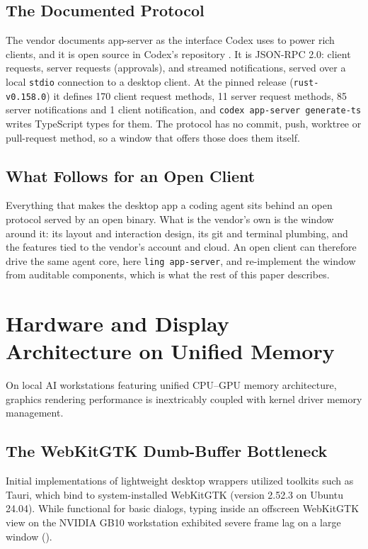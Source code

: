 \documentclass[11pt]{article}
\newcommand{\code}[1]{\texttt{#1}}
\begin{document}
\subsection{The Documented Protocol}

The vendor documents app-server as the interface Codex uses to power rich clients, and it is open source in Codex's
repository \cite{openai2026codex}. It is JSON-RPC 2.0: client requests, server requests (approvals), and streamed
notifications, served over a local \code{stdio} connection to a desktop client. At the pinned release
(\code{rust-v0.158.0}) it defines 170 client request methods, 11 server request methods, 85 server notifications and 1
client notification, and \code{codex app-server generate-ts} writes TypeScript types for them. The protocol has no
commit, push, worktree or pull-request method, so a window that offers those does them itself.

\subsection{What Follows for an Open Client}

Everything that makes the desktop app a coding agent sits behind an open protocol served by an open binary. What is
the vendor's own is the window around it: its layout and interaction design, its git and terminal plumbing, and the
features tied to the vendor's account and cloud. An open client can therefore drive the same agent core, here
\code{ling app-server}, and re-implement the window from auditable components, which is what the rest of this paper
describes.

\section{Hardware and Display Architecture on Unified Memory}
\label{sec:display-hardware}

On local AI workstations featuring unified CPU--GPU memory architecture, graphics rendering performance is
inextricably coupled with kernel driver memory management.

\subsection{The WebKitGTK Dumb-Buffer Bottleneck}

Initial implementations of lightweight desktop wrappers utilized toolkits such as Tauri, which bind to system-installed
WebKitGTK (version 2.52.3 on Ubuntu 24.04). While functional for basic dialogs, typing inside an offscreen WebKitGTK
view on the NVIDIA GB10 workstation exhibited severe frame lag on a large window ().
\end{document}
